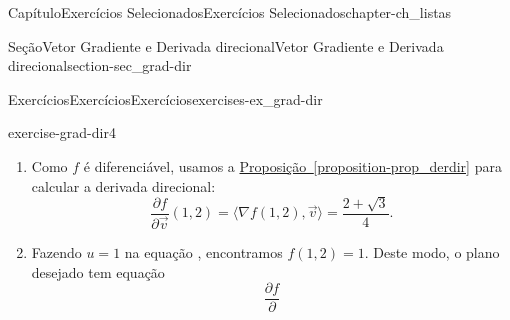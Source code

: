 \documentclass[oneside,10pt,]{book}
\newcommand{\xreffont}{\relax}
\numberwithin{equation}{section}
\begin{document}
\begin{chapterptx}{Capítulo}{Exercícios Selecionados}{}{Exercícios Selecionados}{}{}{chapter-ch_listas}
\begin{sectionptx}{Seção}{Vetor Gradiente e Derivada direcional}{}{Vetor Gradiente e Derivada direcional}{}{}{section-sec_grad-dir}
\begin{exercises-subsection-numberless}{Exercícios}{Exercícios}{}{Exercícios}{}{}{exercises-ex_grad-dir}
\begin{divisionexercise}{4}{}{}{exercise-grad-dir4}
\begin{enumerate}[label=(\alph*)]
\begin{equation*}
0=\left\langle
\nabla f(\gamma(t)) , \gamma'(t)\right\rangle = \left\langle
\nabla f(\gamma(t)) , \left(-\csc^2 (t), 2\sec^2(t)
\tan(t)\right)\right\rangle, \forall t \in ]0,
\pi/2[.
\end{equation*}
%
\par
Em particular, para \(t=\pi/4\), temos%
\begin{equation*}
\left\langle \nabla f(1,2) , (-2,4) \right\rangle = 0
\implies \boxed{\dfrac{\partial f}{\partial x}(1,2) = 2
\frac{\partial f}{\partial y}(1,2)}.
\end{equation*}
%
\par
Por outro lado, de acordo com a condição (ii), sabemos que%
\begin{equation}
\frac{u^3}{2} - \frac{\sqrt[3]{u}}{2} +1 = f\big(\sqrt[3]{u}, u^2+1\big), \forall u >0.\label{men-grad-dir4-eq1}
\end{equation}
%
\par
Usando a Regra da Cadeia (\hyperref[theorem-teo_cadeia]{Teorema~{\xreffont\ref{theorem-teo_cadeia}}}), derivamos os dois membros em relação a \(u\), concluindo que%
\begin{equation*}
\frac{3u^2}{2} - \frac{1}{6\sqrt[3]{u^2}} =
\left\langle \nabla f(\sqrt[3]{u}, u^2+1) ,
\Big(\frac{1}{3\sqrt[3]{u^2}},2u\Big)\right\rangle,
\forall u > 0.
\end{equation*}
%
\par
Tomando \(u=1\), obtemos%
\begin{equation*}
\frac{8}{6} =
\left\langle \nabla f(1,2) ,
\Big(\frac{1}{3},2\Big)\right\rangle \implies
\boxed{\frac{\partial f}{\partial x}(1,2) + 6\frac{\partial
f}{\partial y}(1,2) = 4}.
\end{equation*}
Logo, usando as equações para as derivadas parciais em destaque, \(\nabla f(1,2) = \Big(
1 , \dfrac{1}{2}\Big)\).%
\item{}Como \(f\) é diferenciável, usamos a \hyperref[proposition-prop_derdir]{Proposição~{\xreffont\ref{proposition-prop_derdir}}} para calcular a derivada direcional:%
\begin{equation*}
\dfrac{\partial f}{\partial \vec{v}}(1,2) = \big\langle
\nabla f(1,2), \vec{v}\big\rangle =
\frac{2+\sqrt{3}}{4}.
\end{equation*}
%
\item{}Fazendo \(u=1\) na equação , encontramos \(f(1,2)=1\). Deste modo, o plano desejado tem equação%
\begin{equation*}
\dfrac{\partial f}{\partial
}
\end{equation*}
\end{enumerate}
\end{divisionexercise}
\end{exercises-subsection-numberless}
\end{sectionptx}
\end{chapterptx}
\end{document}
